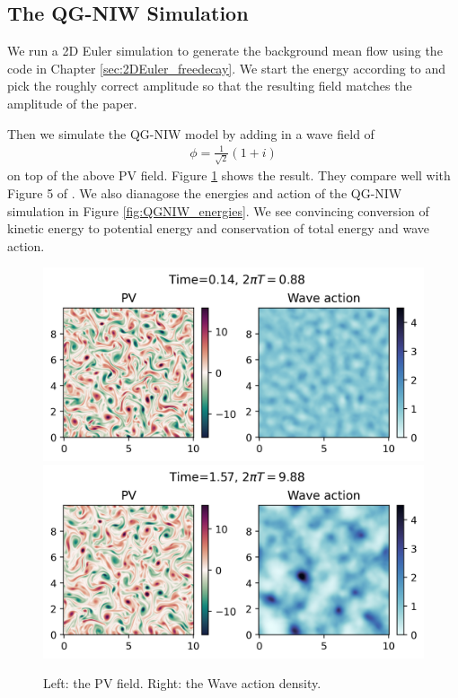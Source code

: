 \subsection{The QG-NIW Simulation}
We run a 2D Euler simulation to generate the background mean flow using the code in Chapter \ref{sec:2DEuler_freedecay}. We start the energy according to \cite[(4.2)]{RochaEtAl_18} and pick the roughly correct amplitude so that the resulting field matches the amplitude of the \cite{RochaEtAl_18} paper. 

Then we simulate the QG-NIW model by adding in a wave field of
\begin{align}
    \phi = \frac{1}{\sqrt{2}}(1+i)
\end{align}
on top of the above PV field. Figure \ref{fig:QGNIW_fields_t} shows the result. They compare well with Figure 5 of \cite{RochaEtAl_18}. We also dianagose the energies and action of the QG-NIW simulation in Figure \ref{fig:QGNIW_energies}. We see convincing conversion of kinetic energy to potential energy and conservation of total energy and wave action.
\begin{figure}
    \centering
    \includegraphics{QGNIW_fields_t1}
    \includegraphics{QGNIW_fields_t10}
    \caption{Left: the PV field. Right: the Wave action density.}
    \label{fig:QGNIW_fields_t}
\end{figure}

